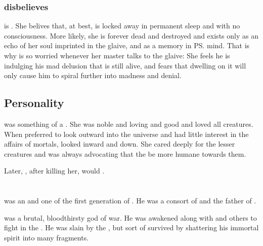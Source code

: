 \subsubsection{\Criseis{} disbelieves}
\Criseis{} is \skeptical. 
She belives that, at best, \Triestessakhin{} is locked away in permanent sleep and with no consciousness. 
More likely, she is forever dead and destroyed and exists only as an echo of her soul imprinted in the glaive, and as a memory in \ps{\Ishnaruchaefir} mind. 
That is why \Criseis{} is so worried whenever her master talks to the glaive: 
She feels he is indulging his mad delusion that \Triestessakhin{} is still alive, and fears that dwelling on it will only cause him to spiral further into madness and denial. 









\subsection{Personality}
\Rystessakhin was something of a .
She was noble and loving and good and loved all creatures.
When \Ishnaruchaefir preferred to look outward into the universe and had little interest in the affairs of mortals, \Rystessakhin looked inward and down. 
She cared deeply for the lesser creatures and was always advocating that the \dragons be more humane towards them.

Later, \Ishnaruchaefir, after killing her, would . 















\section{\ApharesNesthra}
\index{\ApharesNesthra}
\ApharesNesthra was an \ophidian and one of the first generation of \dragons.
He was a consort of \Xserasshana and the father of \Secherdamon. 

\ApharesNesthra was a brutal, bloodthirsty god of war. 
He was awakened along with \Sethicus and others to fight in the \firstbanewar. 
He was slain by the \banes, but sort of survived by shattering his immortal spirit into many fragments. 

